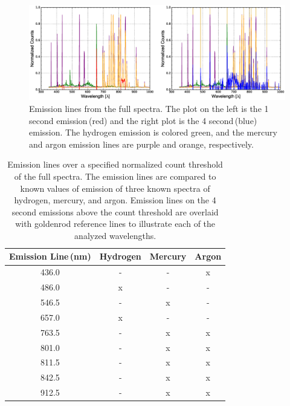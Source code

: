 \documentclass[twocolumn]{aastex6}
\begin{document}
\begin{figure}[ht]
  \centering
  \includegraphics[scale=0.4]{emission.eps}%
  \caption{Emission lines from the full spectra. The plot on the left is the 1 second emission\,(red) and the right plot is the 4 second\,(blue) emission. The hydrogen emission is colored green, and the mercury and argon emission lines are purple and orange, respectively.}
  \label{emiss}
\end{figure}



\begin{table}[h]
\begin{center}
\caption{Emission lines over a specified normalized count threshold of the full spectra. The emission lines are compared to known values of emission of three known spectra of hydrogen, mercury, and argon. Emission lines on the 4 second emissions above the count threshold are overlaid with goldenrod reference lines to illustrate each of the analyzed wavelengths.}

\begin{tabular}{ c | c | c | c}

Emission Line\,(nm) & Hydrogen & Mercury & Argon \\ \hline \hline
436.0 & - & - & x \\
486.0 & x & - & -  \\ 
546.5 & - & x & -  \\ 
657.0 & x & - & -  \\ 
763.5 & - & x & x  \\ 
801.0 & - & x & x  \\ 
811.5 & - & x & x  \\ 
842.5 & - & x & x  \\ 
912.5 & - & x & x  \\ 


\end{tabular}
\label{emissions}
\end{center}
\end{table}
\end{document}
